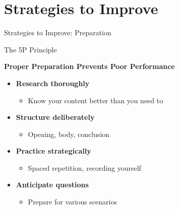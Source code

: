 \documentclass{beamer}
\begin{document}
\section{Strategies to Improve}

\begin{frame}{Strategies to Improve: Preparation}
    \begin{block}{The 5P Principle}
        \begin{center}
            \textbf{Proper Preparation Prevents Poor Performance}
        \end{center}
    \end{block}
    
    \begin{itemize}
        \item \textbf{Research thoroughly}
            \begin{itemize}
                \item Know your content better than you need to
            \end{itemize}
        \item \textbf{Structure deliberately}
            \begin{itemize}
                \item Opening, body, conclusion
            \end{itemize}
        \item \textbf{Practice strategically}
            \begin{itemize}
                \item Spaced repetition, recording yourself
            \end{itemize}
        \item \textbf{Anticipate questions}
            \begin{itemize}
                \item Prepare for various scenarios
            \end{itemize}
    \end{itemize}
\end{frame}
\end{document}
